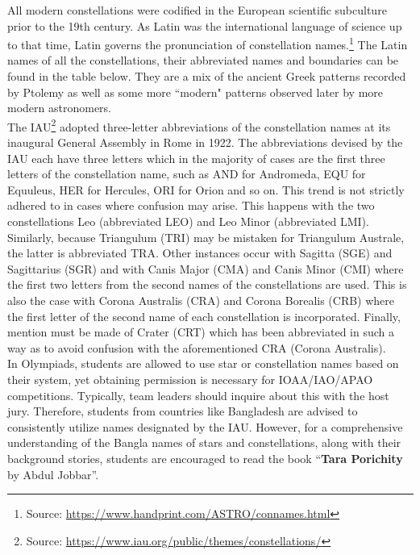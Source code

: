 \documentclass[a4paper,12pt]{extarticle}
\begin{document}
All modern constellations were codified in the European scientific subculture prior to the 19th century. As Latin was the international language of science up to that time, Latin governs the pronunciation of constellation names.\footnote{Source: \url{https://www.handprint.com/ASTRO/connames.html}} The Latin names of all the constellations, their abbreviated names and boundaries can be found in the table below. They are a mix of the ancient Greek patterns recorded by Ptolemy as well as some more ``modern" patterns observed later by more modern astronomers.\\

The IAU\footnote{Source: \url{https://www.iau.org/public/themes/constellations/}} adopted three-letter abbreviations of the constellation names at its inaugural General Assembly in Rome in 1922. The abbreviations devised by the IAU each have three letters which in the majority of cases are the first three letters of the constellation name, such as AND for Andromeda, EQU for Equuleus, HER for Hercules, ORI for Orion and so on. This trend is not strictly adhered to in cases where confusion may arise. This happens with the two constellations Leo (abbreviated LEO) and Leo Minor (abbreviated LMI). Similarly, because Triangulum (TRI) may be mistaken for Triangulum Australe, the latter is abbreviated TRA. Other instances occur with Sagitta (SGE) and Sagittarius (SGR) and with Canis Major (CMA) and Canis Minor (CMI) where the first two letters from the second names of the constellations are used. This is also the case with Corona Australis (CRA) and Corona Borealis (CRB) where the first letter of the second name of each constellation is incorporated. Finally, mention must be made of Crater (CRT) which has been abbreviated in such a way as to avoid confusion with the aforementioned CRA (Corona Australis).\\

In Olympiads, students are allowed to use star or constellation names based on their system, yet obtaining permission is necessary for IOAA/IAO/APAO competitions. Typically, team leaders should inquire about this with the host jury. Therefore, students from countries like Bangladesh are advised to consistently utilize names designated by the IAU. However, for a comprehensive understanding of the Bangla names of stars and constellations, along with their background stories, students are encouraged to read the book {\color{blue}``\textbf{Tara Porichity} by Abdul Jobbar''}.\\
\end{document}

